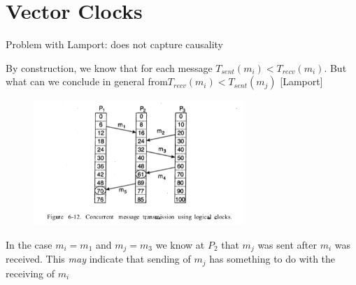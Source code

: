 \documentclass[ngerman,a4paper]{report}
\begin{document}
\section{Vector Clocks}
\begin{compactitem}
	\item Problem with Lamport: does not capture causality
	\item By construction, we know that for each message $T_{sent}(m_i) < T_{recv} (m_i)$. But what can we conclude in general from$ T_{recv} (m_i) < T_{sent} (m_j)$ [Lamport]

\begin{figure}[h]
	\centering
	\includegraphics[width=300px]{gfx/lamport-concurrent.png}
	\label{img:lamport-concurrent}
\end{figure}

	\item
		In the case $m_i=m_1$ and $m_j = m_3$ we know at $P_2$  that $m_j$ was sent after $m_i$ was received. This \emph{may} indicate that sending of $m_j$ has something to do with the receiving of $m_i$


\end{compactitem}
\end{document}
